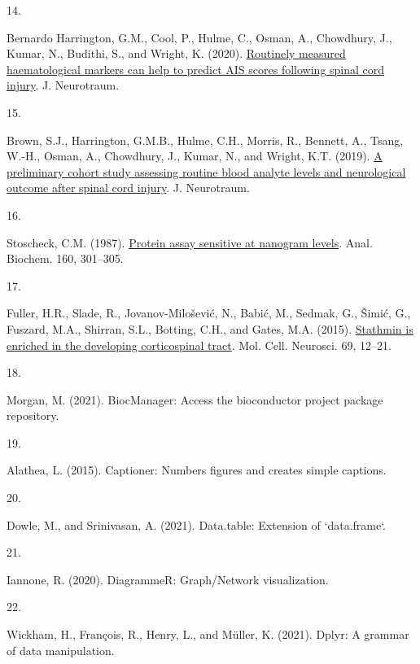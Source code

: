 \documentclass[
]{article}
\newlength{\cslhangindent}
\newlength{\csllabelwidth}
\newlength{\cslentryspacingunit} %
\newenvironment{CSLReferences}[2] %
 {%
  \setlength{\parindent}{0pt}
  \ifodd #1
  \let\oldpar\par
  \def\par{\hangindent=\cslhangindent\oldpar}
  \fi
  \setlength{\parskip}{#2\cslentryspacingunit}
 }%
 {}
\newcommand{\CSLLeftMargin}[1]{\parbox[t]{\csllabelwidth}{#1}}
\newcommand{\CSLRightInline}[1]{\parbox[t]{\linewidth - \csllabelwidth}{#1}\break}
\begin{document}
\begin{CSLReferences}{0}{0}
\leavevmode{}%
\CSLLeftMargin{14. }
\CSLRightInline{Bernardo Harrington, G.M., Cool, P., Hulme, C., Osman, A., Chowdhury, J., Kumar, N., Budithi, S., and Wright, K. (2020). \href{https://doi.org/10.1089/neu.2020.7144}{Routinely measured haematological markers can help to predict {AIS} scores following spinal cord injury}. J. Neurotraum.}

\leavevmode{}%
\CSLLeftMargin{15. }
\CSLRightInline{Brown, S.J., Harrington, G.M.B., Hulme, C.H., Morris, R., Bennett, A., Tsang, W.-H., Osman, A., Chowdhury, J., Kumar, N., and Wright, K.T. (2019). \href{https://doi.org/10.1089/neu.2019.6495}{A preliminary cohort study assessing routine blood analyte levels and neurological outcome after spinal cord injury}. J. Neurotraum.}

\leavevmode{}%
\CSLLeftMargin{16. }
\CSLRightInline{Stoscheck, C.M. (1987). \href{https://doi.org/10.1016/0003-2697(87)90051-0}{Protein assay sensitive at nanogram levels}. Anal. Biochem. 160, 301--305.}

\leavevmode{}%
\CSLLeftMargin{17. }
\CSLRightInline{Fuller, H.R., Slade, R., Jovanov-Milošević, N., Babić, M., Sedmak, G., Šimić, G., Fuszard, M.A., Shirran, S.L., Botting, C.H., and Gates, M.A. (2015). \href{https://doi.org/10.1016/j.mcn.2015.09.003}{Stathmin is enriched in the developing corticospinal tract}. Mol. Cell. Neurosci. 69, 12--21.}

\leavevmode{}%
\CSLLeftMargin{18. }
\CSLRightInline{Morgan, M. (2021). {BiocManager}: {Access} the bioconductor project package repository.}

\leavevmode{}%
\CSLLeftMargin{19. }
\CSLRightInline{Alathea, L. (2015). Captioner: {Numbers} figures and creates simple captions.}

\leavevmode{}%
\CSLLeftMargin{20. }
\CSLRightInline{Dowle, M., and Srinivasan, A. (2021). Data.table: {Extension} of `data.frame`.}

\leavevmode{}%
\CSLLeftMargin{21. }
\CSLRightInline{Iannone, R. (2020). {DiagrammeR}: {Graph}/{Network} visualization.}

\leavevmode{}%
\CSLLeftMargin{22. }
\CSLRightInline{Wickham, H., François, R., Henry, L., and Müller, K. (2021). Dplyr: {A} grammar of data manipulation.}


\end{CSLReferences}
\end{document}
